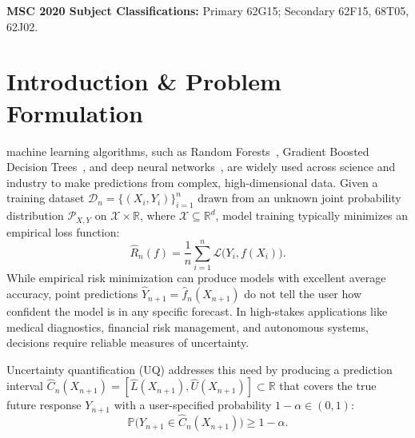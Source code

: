 \documentclass[journal]{IEEEtran}
\begin{document}
\noindent\textbf{MSC 2020 Subject Classifications:} Primary 62G15; Secondary 62F15, 68T05, 62J02.

\section{Introduction \& Problem Formulation}
 machine learning algorithms, such as Random Forests~\cite{breiman2001}, Gradient Boosted Decision Trees~\cite{chen2016}, and deep neural networks~\cite{goodfellow2016}, are widely used across science and industry to make predictions from complex, high-dimensional data. Given a training dataset $\mathcal{D}_n = \{(X_i, Y_i)\}_{i=1}^n$ drawn from an unknown joint probability distribution $\mathcal{P}_{X,Y}$ on $\mathcal{X} \times \mathbb{R}$, where $\mathcal{X} \subseteq \mathbb{R}^d$, model training typically minimizes an empirical loss function:
\begin{equation}
\hat{R}_n(f) = \frac{1}{n} \sum_{i=1}^n \mathcal{L}\big(Y_i, f(X_i)\big).
\end{equation}
While empirical risk minimization can produce models with excellent average accuracy, point predictions $\hat{Y}_{n+1} = \hat{f}_n(X_{n+1})$ do not tell the user how confident the model is in any specific forecast. In high-stakes applications like medical diagnostics, financial risk management, and autonomous systems, decisions require reliable measures of uncertainty. 

Uncertainty quantification (UQ) addresses this need by producing a prediction interval $\hat{C}_n(X_{n+1}) = [\hat{L}(X_{n+1}), \hat{U}(X_{n+1})] \subset \mathbb{R}$ that covers the true future response $Y_{n+1}$ with a user-specified probability $1 - \alpha \in (0, 1)$:
\begin{equation}
\mathbb{P}\big(Y_{n+1} \in \hat{C}_n(X_{n+1})\big) \ge 1 - \alpha.
\end{equation}
\end{document}
